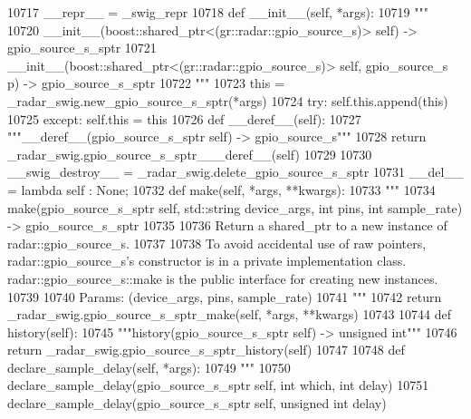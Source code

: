 \begin{DoxyCode}
{{{{{{{{{{{{{{{{{{{{{{{{{{{{{{{{{{10717     \_\_repr\_\_ = \_swig\_repr
10718     \textcolor{keyword}{def }__init__(self, *args): 
10719         \textcolor{stringliteral}{"""}
10720 \textcolor{stringliteral}{        \_\_init\_\_(boost::shared\_ptr<(gr::radar::gpio\_source\_s)> self) -> gpio\_source\_s\_sptr}
10721 \textcolor{stringliteral}{        \_\_init\_\_(boost::shared\_ptr<(gr::radar::gpio\_source\_s)> self, gpio\_source\_s p) -> gpio\_source\_s\_sptr}
10722 \textcolor{stringliteral}{        """}
10723         this = \_radar\_swig.new\_gpio\_source\_s\_sptr(*args)
10724         \textcolor{keywordflow}{try}: self.this.append(this)
10725         \textcolor{keywordflow}{except}: self.this = this
10726     \textcolor{keyword}{def }__deref__(self):
10727         \textcolor{stringliteral}{"""\_\_deref\_\_(gpio\_source\_s\_sptr self) -> gpio\_source\_s"""}
10728         \textcolor{keywordflow}{return} \_radar\_swig.gpio\_source\_s\_sptr\_\_\_deref\_\_(self)
10729 
10730     \_\_swig\_destroy\_\_ = \_radar\_swig.delete\_gpio\_source\_s\_sptr
10731     \_\_del\_\_ = \textcolor{keyword}{lambda} self : \textcolor{keywordtype}{None};
10732     \textcolor{keyword}{def }make(self, *args, **kwargs):
10733         \textcolor{stringliteral}{"""}
10734 \textcolor{stringliteral}{        make(gpio\_source\_s\_sptr self, std::string device\_args, int pins, int sample\_rate) ->
       gpio\_source\_s\_sptr}
10735 \textcolor{stringliteral}{}
10736 \textcolor{stringliteral}{        Return a shared\_ptr to a new instance of radar::gpio\_source\_s.}
10737 \textcolor{stringliteral}{}
10738 \textcolor{stringliteral}{        To avoid accidental use of raw pointers, radar::gpio\_source\_s's constructor is in a private
       implementation class. radar::gpio\_source\_s::make is the public interface for creating new instances.}
10739 \textcolor{stringliteral}{}
10740 \textcolor{stringliteral}{        Params: (device\_args, pins, sample\_rate)}
10741 \textcolor{stringliteral}{        """}
10742         \textcolor{keywordflow}{return} \_radar\_swig.gpio\_source\_s\_sptr\_make(self, *args, **kwargs)
10743 
10744     \textcolor{keyword}{def }history(self):
10745         \textcolor{stringliteral}{"""history(gpio\_source\_s\_sptr self) -> unsigned int"""}
10746         \textcolor{keywordflow}{return} \_radar\_swig.gpio\_source\_s\_sptr\_history(self)
10747 
10748     \textcolor{keyword}{def }declare_sample_delay(self, *args):
10749         \textcolor{stringliteral}{"""}
10750 \textcolor{stringliteral}{        declare\_sample\_delay(gpio\_source\_s\_sptr self, int which, int delay)}
10751 \textcolor{stringliteral}{        declare\_sample\_delay(gpio\_source\_s\_sptr self, unsigned int delay)}
}}}}}}}}}}}}}}}}}}}}}}}}}}}}}}}}}}
\end{DoxyCode}
